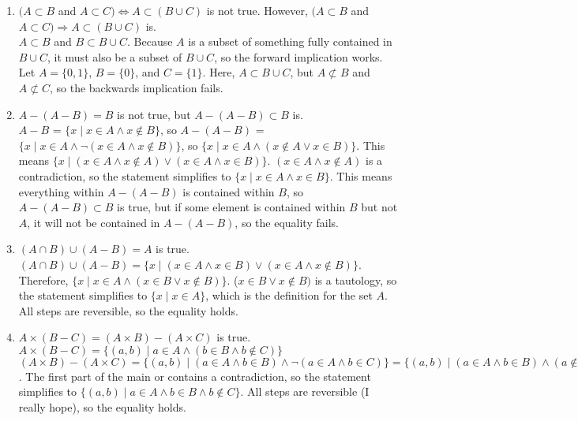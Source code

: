 \documentclass{article}
\begin{document}
\begin{enumerate}
            \begin{enumerate}
                  \item $(A \subset B$ and $A \subset C) \Leftrightarrow A \subset (B \cup C)$ is not true. However, $(A \subset B$ and $A \subset C) \Rightarrow A \subset (B \cup C)$ is.\\
                  $A \subset B$ and $B \subset B \cup C$. Because $A$ is a subset of something fully contained in $B \cup C$, it must also be a subset of $B \cup C$, so the forward implication works. Let $A = \{0, 1\}$, $B = \{0\}$, and $C = \{1\}$. Here, $A \subset B \cup C$, but $A \not\subset B$ and $A \not\subset C$, so the backwards implication fails.
                        \setcounter{enumii}{4}
                  \item $A - (A - B) = B$ is not true, but $A - (A - B) \subset B$ is.\\
                  $A - B$ = $\{x \mid x \in A \land x \notin B\}$, so $A - (A - B)$ = $\{x \mid x \in A \land \neg (x \in A \land x \notin B)\}$, so $\{x \mid x \in A \land (x \notin A \lor x \in B)\}$. This means $\{x \mid (x \in A \land x \notin A) \lor (x \in A \land x \in B)\}$. $(x \in A \land x \notin A)$ is a contradiction, so the statement simplifies to $\{x \mid x \in A \land x \in B\}$. This means everything within $A - (A - B)$ is contained within $B$, so $A - (A - B) \subset B$ is true, but if some element is contained within $B$ but not $A$, it will not be contained in $A - (A - B)$, so the equality fails.
                        \setcounter{enumii}{8}
                  \item $(A \cap B) \cup (A - B) = A$ is true.\\
                  $(A \cap B) \cup (A - B) = \{x \mid (x \in A \land x \in B) \lor (x \in A \land x \notin B)\}$. Therefore, $\{x \mid x \in A \land (x \in B \lor x \notin B)\}$. ($x \in B \lor x \notin B)$ is a tautology, so the statement simplifies to $\{x \mid x \in A\}$, which is the definition for the set $A$. All steps are reversible, so the equality holds.
                        \setcounter{enumii}{14}
                  \item $A \times (B-C) = (A \times B) - (A \times C)$ is true.\\
                  $A \times (B-C) = \{(a, b) \mid a \in A \land (b \in B \land b \notin C)\}$\\
                  $(A \times B) - (A \times C) = \{(a, b) \mid (a \in A \land b \in B) \land \neg (a \in A \land b \in C)\} = \{(a, b) \mid (a \in A \land b \in B) \land (a \notin A \lor b \notin C)\} = \{(a, b) \mid (a \in A \land b \in B \land a \notin A) \lor (a \in A \land b \in B \land b \notin C)\}$. The first part of the main or contains a contradiction, so the statement simplifies to $\{(a, b) \mid a \in A \land b \in B \land b \notin C\}$. All steps are reversible (I really hope), so the equality holds.

\end{enumerate}
\end{enumerate}
\end{document}
